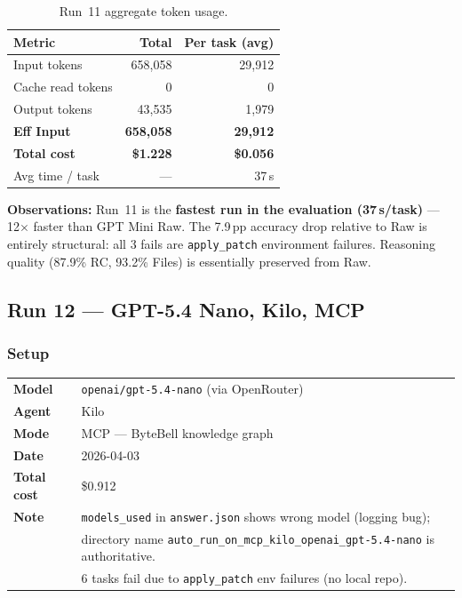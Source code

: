 \begin{table}[h]
\centering
\caption{Run~11 aggregate token usage.}\label{tab:r11-tokens}
\begin{tabular}{lrr}
\toprule
\textbf{Metric} & \textbf{Total} & \textbf{Per task (avg)} \\
\midrule
Input tokens         & 658,058  & 29,912 \\
Cache read tokens    & 0        & 0 \\
Output tokens        & 43,535   & 1,979  \\
\midrule
\textbf{Eff Input}   & \textbf{658,058} & \textbf{29,912} \\
\textbf{Total cost}  & \textbf{\$1.228} & \textbf{\$0.056} \\
Avg time / task      & ---      & 37\,s \\
\bottomrule
\end{tabular}
\end{table}

\noindent
\textbf{Observations:} Run~11 is the \textbf{fastest run in the evaluation
(37\,s/task)} --- 12$\times$ faster than GPT Mini Raw.
The 7.9\,pp accuracy drop relative to Raw is entirely structural:
all 3 fails are \texttt{apply\_patch} environment failures.
Reasoning quality (87.9\% RC, 93.2\% Files) is essentially preserved from Raw.

\subsection{Run 12 --- GPT-5.4 Nano, Kilo, MCP}
\label{sec:run12}

\subsubsection{Setup}

\begin{tabular}{ll}
\textbf{Model}     & \texttt{openai/gpt-5.4-nano} (via OpenRouter) \\
\textbf{Agent}     & Kilo \\
\textbf{Mode}      & MCP --- ByteBell knowledge graph \\
\textbf{Date}      & 2026-04-03 \\
\textbf{Total cost} & \$0.912 \\
\textbf{Note}      & \texttt{models\_used} in \texttt{answer.json} shows wrong model (logging bug); \\
                   & directory name \texttt{auto\_run\_on\_mcp\_kilo\_openai\_gpt-5.4-nano} is authoritative. \\
                   & 6 tasks fail due to \texttt{apply\_patch} env failures (no local repo). \\
\end{tabular}

